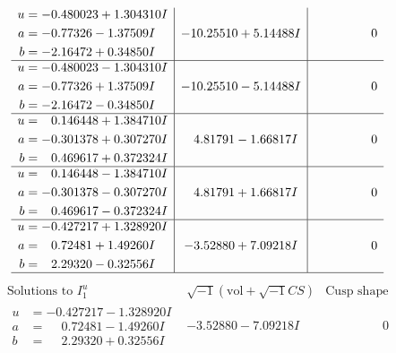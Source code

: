 \documentclass[1p]{elsarticle_modified}
\theoremstyle{definition}
\newcommand{\I}{\sqrt{-1}}
\begin{document}
$$\begin{array}{c|c|c}
\begin{aligned}
u &= -0.480023 + 1.304310 I \\
a &= -0.77326 - 1.37509 I \\
b &= -2.16472 + 0.34850 I\end{aligned}
 & -10.25510 + 5.14488 I & \phantom{-0.000000 } 0 \\ \hline\begin{aligned}
u &= -0.480023 - 1.304310 I \\
a &= -0.77326 + 1.37509 I \\
b &= -2.16472 - 0.34850 I\end{aligned}
 & -10.25510 - 5.14488 I & \phantom{-0.000000 } 0 \\ \hline\begin{aligned}
u &= \phantom{-}0.146448 + 1.384710 I \\
a &= -0.301378 + 0.307270 I \\
b &= \phantom{-}0.469617 + 0.372324 I\end{aligned}
 & \phantom{-}4.81791 - 1.66817 I & \phantom{-0.000000 } 0 \\ \hline\begin{aligned}
u &= \phantom{-}0.146448 - 1.384710 I \\
a &= -0.301378 - 0.307270 I \\
b &= \phantom{-}0.469617 - 0.372324 I\end{aligned}
 & \phantom{-}4.81791 + 1.66817 I & \phantom{-0.000000 } 0 \\ \hline\begin{aligned}
u &= -0.427217 + 1.328920 I \\
a &= \phantom{-}0.72481 + 1.49260 I \\
b &= \phantom{-}2.29320 - 0.32556 I\end{aligned}
 & -3.52880 + 7.09218 I & \phantom{-0.000000 } 0\\
 \hline 
 \end{array}$$\newpage$$\begin{array}{c|c|c}  
\text{Solutions to }I^u_{1}& \I (\text{vol} + \sqrt{-1}CS) & \text{Cusp shape}\\
 \hline 
\begin{aligned}
u &= -0.427217 - 1.328920 I \\
a &= \phantom{-}0.72481 - 1.49260 I \\
b &= \phantom{-}2.29320 + 0.32556 I\end{aligned}
 & -3.52880 - 7.09218 I & \phantom{-0.000000 } 0 \\ \hline\begin{aligned}

\end{aligned}
\end{array}$$
\end{document}
